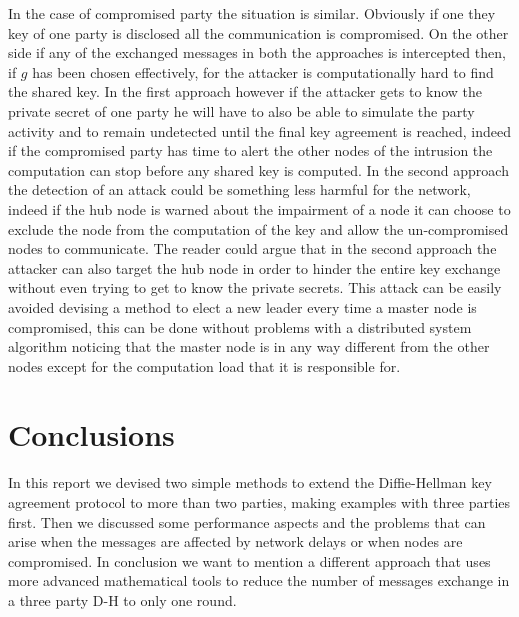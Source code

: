 \documentclass[11pt]{article}
\begin{document}
In the case of compromised party the situation is similar. Obviously if one they key of one party is disclosed all the communication is compromised. On the other side if any of the exchanged messages in both the approaches is intercepted then, if $g$ has been chosen effectively, for the attacker is computationally hard to find the shared key. In the first approach however if the attacker gets to know the private secret of one party he will have to also be able to simulate the party activity and to remain undetected until the final key agreement is reached, indeed if the compromised party has time to alert the other nodes of the intrusion the computation can stop before any shared key is computed. In the second approach the detection of an attack could be something less harmful for the network, indeed if the hub node is warned about the impairment of a node it can choose to exclude the node from the computation of the key and allow the un-compromised nodes to communicate. The reader could argue that in the second approach the attacker can also target the hub node in order to hinder the entire key exchange without even trying to get to know the private secrets. This attack can be easily avoided devising a method to elect a new leader every time a master node is compromised, this can be done without problems with a distributed system algorithm noticing that the master node is in any way different from the other nodes except for the computation load that it is responsible for.

\section{Conclusions}
In this report we devised two simple methods to extend the Diffie-Hellman key agreement protocol to more than two parties, making examples with three parties first. Then we discussed some performance aspects and the problems that can arise when the messages are affected by network delays or when nodes are compromised. In conclusion we want to mention a different approach \cite{Joux2000} that uses more advanced mathematical tools to reduce the number of messages exchange in a three party D-H to only one round.


\nocite{*} %
 

\end{document}
